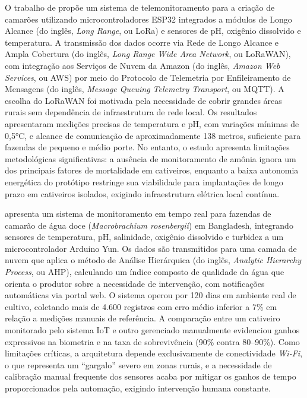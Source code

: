 \documentclass[11pt,a4paper]{article}
\begin{document}
O trabalho de \cite{dantas2020} propõe um sistema de telemonitoramento para a criação de camarões utilizando microcontroladores ESP32 integrados a módulos de Longo Alcance (do inglês, \textit{Long Range}, ou LoRa) e sensores de pH, oxigênio dissolvido e temperatura. A transmissão dos dados ocorre via Rede de Longo Alcance e Ampla Cobertura (do inglês, \textit{Long Range Wide Area Network}, ou LoRaWAN), com integração aos Serviços de Nuvem da Amazon (do inglês, \textit{Amazon Web Services}, ou AWS) por meio do Protocolo de Telemetria por Enfileiramento de Mensagens (do inglês, \textit{Message Queuing Telemetry Transport}, ou MQTT). A escolha do LoRaWAN foi motivada pela necessidade de cobrir grandes áreas rurais sem dependência de infraestrutura de rede local. Os resultados apresentaram medições precisas de temperatura e pH, com variações mínimas de 0,5°C, e alcance de comunicação de aproximadamente 138 metros, suficiente para fazendas de pequeno e médio porte. No entanto, o estudo apresenta limitações metodológicas significativas: a ausência de monitoramento de amônia ignora um dos principais fatores de mortalidade em cativeiros, enquanto a baixa autonomia energética do protótipo restringe sua viabilidade para implantações de longo prazo em cativeiros isolados, exigindo infraestrutura elétrica local contínua.
 
\cite{Uddin2020} apresenta um sistema de monitoramento em tempo real para fazendas de camarão de água doce (\textit{Macrobrachium rosenbergii}) em Bangladesh, integrando sensores de temperatura, pH, salinidade, oxigênio dissolvido e turbidez a um microcontrolador Arduino Yun. Os dados são transmitidos para uma camada de nuvem que aplica o método de Análise Hierárquica (do inglês, \textit{Analytic Hierarchy Process}, ou AHP), calculando um índice composto de qualidade da água que orienta o produtor sobre a necessidade de intervenção, com notificações automáticas via portal web. O sistema operou por 120 dias em ambiente real de cultivo, coletando mais de 4.600 registros com erro médio inferior a 7\% em relação a medições manuais de referência. A comparação entre um cativeiro monitorado pelo sistema IoT e outro gerenciado manualmente evidenciou ganhos expressivos na biometria e na taxa de sobrevivência (90\% contra 80--90\%). Como limitações críticas, a arquitetura depende exclusivamente de conectividade \textit{Wi-Fi}, o que representa um ``gargalo'' severo em zonas rurais, e a necessidade de calibração manual frequente dos sensores acaba por mitigar os ganhos de tempo proporcionados pela automação, exigindo intervenção humana constante.
 
\end{document}
